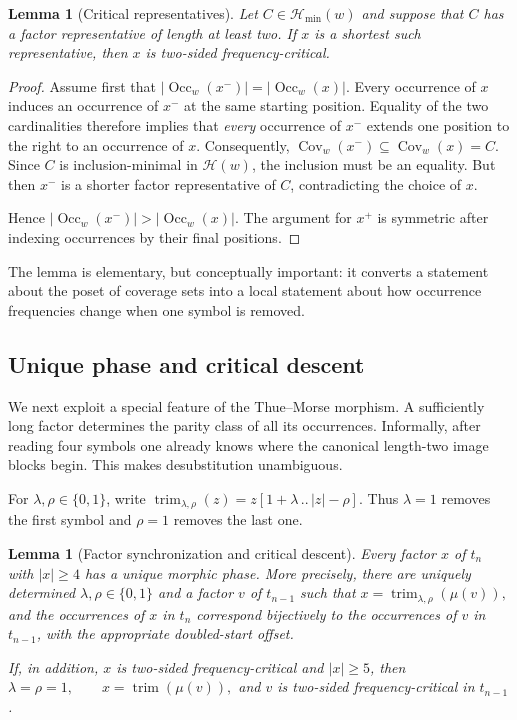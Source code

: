 \documentclass[10pt,a4paper]{article}
\newtheorem{lemma}[theorem]{Lemma}
\theoremstyle{definition}\newtheorem{definition}[theorem]{Definition}
\theoremstyle{remark}\newtheorem{remark}[theorem]{Remark}
\newcommand{\Occ}{\operatorname{Occ}}
\newcommand{\Cov}{\operatorname{Cov}}
\newcommand{\Hmin}{\mathcal{H}_{\min}}
\begin{document}
\begin{lemma}[Critical representatives]
\label{lem:critical-representatives}
Let $C\in\Hmin(w)$ and suppose that $C$ has a factor representative of length at least two.  If $x$ is a shortest such representative, then $x$ is two-sided frequency-critical.
\end{lemma}

\begin{proof}
Assume first that
$
 |\Occ_w(x^-)|=|\Occ_w(x)|.
$
Every occurrence of $x$ induces an occurrence of $x^-$ at the same starting position.  Equality of the two cardinalities therefore implies that \emph{every} occurrence of $x^-$ extends one position to the right to an occurrence of $x$.  Consequently,
$
 \Cov_w(x^-)\subseteq\Cov_w(x)=C.
$
Since $C$ is inclusion-minimal in $\mathcal H(w)$, the inclusion must be an equality.  But then $x^-$ is a shorter factor representative of $C$, contradicting the choice of $x$.

Hence $|\Occ_w(x^-)|>|\Occ_w(x)|$.  The argument for $x^+$ is symmetric after indexing occurrences by their final positions.
\end{proof}

The lemma is elementary, but conceptually important: it converts a statement about the poset of coverage sets into a local statement about how occurrence frequencies change when one symbol is removed.

\subsection{Unique phase and critical descent}
\label{subsec:critical-descent}

We next exploit a special feature of the Thue--Morse morphism.  A sufficiently long factor determines the parity class of all its occurrences.  Informally, after reading four symbols one already knows where the canonical length-two image blocks begin.  This makes desubstitution unambiguous.

For $\lambda,\rho\in\{0,1\}$, write
$
 \operatorname{trim}_{\lambda,\rho}(z)
   =z[1+\lambda\, ..\, |z|-\rho].
$
Thus $\lambda=1$ removes the first symbol and $\rho=1$ removes the last one.

\begin{lemma}[Factor synchronization and critical descent]
\label{lem:factor-critical-descent}
Every factor $x$ of $t_n$ with $|x|\ge4$ has a unique morphic phase.  More precisely, there are uniquely determined $\lambda,\rho\in\{0,1\}$ and a factor $v$ of $t_{n-1}$ such that
$
 x=\operatorname{trim}_{\lambda,\rho}(\mu(v)),
$
and the occurrences of $x$ in $t_n$ correspond bijectively to the occurrences of $v$ in $t_{n-1}$, with the appropriate doubled-start offset.

If, in addition, $x$ is two-sided frequency-critical and $|x|\ge5$, then
$
 \lambda=\rho=1,
 \qquad
 x=\operatorname{trim}(\mu(v)),
$
and $v$ is two-sided frequency-critical in $t_{n-1}$.
\end{lemma}
\end{document}

